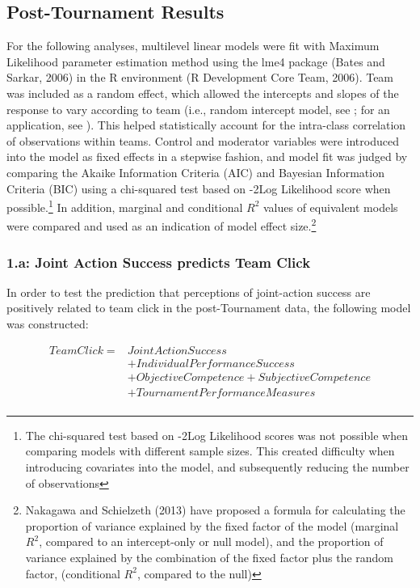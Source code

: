 \subsection{Post-Tournament Results}
For the following analyses, multilevel linear models were fit with Maximum Likelihood parameter estimation method using the lme4 package (Bates and Sarkar, 2006) in the R environment (R Development Core Team, 2006).  Team was included as a random effect, which allowed the intercepts and slopes of the response to vary according to team (i.e., random intercept model, see \citep{Pinheiro2000}; for an application, see \citep{Oberauer2006}). This helped statistically account for the intra-class correlation of observations within teams. Control and moderator variables were introduced into the model as fixed effects in a stepwise fashion, and model fit was judged by comparing the Akaike Information Criteria (AIC) and Bayesian Information Criteria (BIC) using a chi-squared test based on -2Log Likelihood score when possible.\footnote{The chi-squared test based on -2Log Likelihood scores was not possible when comparing models with different sample sizes.
This created difficulty when introducing covariates into the model, and subsequently reducing the number of observations} In addition, marginal and conditional $R^2$ values of equivalent models were compared and used as an indication of model effect size.\footnote{Nakagawa and Schielzeth (2013) have proposed a formula for calculating the proportion of variance explained by the fixed factor of the model (marginal $R^2$, compared to an intercept-only or null model), and the proportion of variance explained by the combination of the fixed factor plus the random factor, (conditional $R^2$, compared to the null)}





\subsubsection{1.a: Joint Action Success predicts Team Click}

In order to test the prediction that perceptions of joint-action success are positively related to team click in the post-Tournament data, the following model was constructed:

\begin{equation}
  \begin{align*}
    Team Click =  & Joint Action Success\\
              & + Individual Performance Success \\
              & + Objective Competence + Subjective Competence\\
              & + TournamentPerformanceMeasures \\
  \end{align*}
\end{equation}
\bigskip


